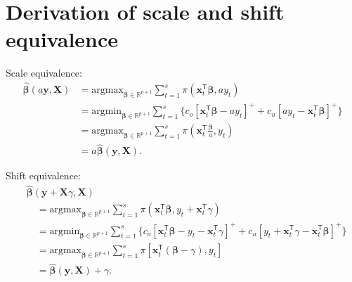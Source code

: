 \documentclass{article}
\begin{document}
\section{Derivation of scale and shift equivalence}\label{app:B}
Scale equivalence:
\[
    \begin{aligned}
        \hat{\boldsymbol{\beta}}(a\mathbf{y},\mathbf{X})
        &=\text{argmax}_{\boldsymbol{\beta}\in \mathbb{R}^{p+1}}\displaystyle\sum_{t=1}^s{\pi(\mathbf{x}_t^{\mathsf{T}}\boldsymbol{\beta},ay_t)}\\
        &=\text{argmin}_{\boldsymbol{\beta}\in \mathbb{R}^{p+1}}\displaystyle\sum_{t=1}^s{\{c_o[\mathbf{x}_t^{\mathsf{T}}\boldsymbol{\beta}-ay_t]^{+}+c_u[ay_t-\mathbf{x}_t^{\mathsf{T}}\boldsymbol{\beta}]^{+}\}}\\
        &=\text{argmax}_{\boldsymbol{\beta}\in \mathbb{R}^{p+1}}\displaystyle\sum_{t=1}^s{\pi\left(\mathbf{x}_t^{\mathsf{T}}\frac{\boldsymbol{\beta}}{a},y_t\right)}\\
        &=a\hat{\boldsymbol{\beta}}(\mathbf{y},\mathbf{X}).
    \end{aligned}
\]
    
Shift equivalence:
\[
    \begin{aligned}
        &\hat{\boldsymbol{\beta}}(\mathbf{y}+\mathbf{X}\gamma,\mathbf{X})\\
        &\quad=\text{argmax}_{\boldsymbol{\beta}\in \mathbb{R}^{p+1}}\displaystyle\sum_{t=1}^s{\pi(\mathbf{x}_t^{\mathsf{T}}\boldsymbol{\beta},y_t+\mathbf{x}_t^{\mathsf{T}}\gamma)}\\
        &\quad=\text{argmin}_{\boldsymbol{\beta}\in \mathbb{R}^{p+1}}\displaystyle\sum_{t=1}^s{\{c_o[\mathbf{x}_t^{\mathsf{T}}\boldsymbol{\beta}-y_t-\mathbf{x}_t^{\mathsf{T}}\gamma]^{+}+c_u[y_t+\mathbf{x}_t^{\mathsf{T}}\gamma-\mathbf{x}_t^{\mathsf{T}}\boldsymbol{\beta}]^{+}\}}\\
        &\quad=\text{argmax}_{\boldsymbol{\beta}\in \mathbb{R}^{p+1}}\displaystyle\sum_{t=1}^s{\pi[\mathbf{x}_t^{\mathsf{T}}(\boldsymbol{\beta}-\gamma),y_t]}\\
        &\quad=\hat{\boldsymbol{\beta}}(\mathbf{y},\mathbf{X})+\gamma.
    \end{aligned}
\]
\end{document}
